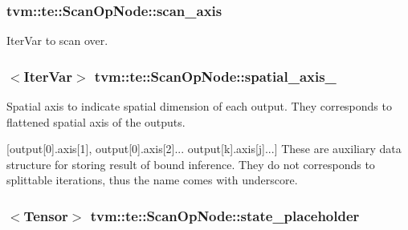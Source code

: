 \subsubsection[{\texorpdfstring{scan\+\_\+axis}{scan_axis}}]{ tvm\+::te\+::\+Scan\+Op\+Node\+::scan\+\_\+axis}\hypertarget{classtvm_1_1te_1_1ScanOpNode_a9c67e6383696efbba8e1ff9bd7470c8a}{}\label{classtvm_1_1te_1_1ScanOpNode_a9c67e6383696efbba8e1ff9bd7470c8a}


Iter\+Var to scan over. 

\subsubsection[{\texorpdfstring{spatial\+\_\+axis\+\_\+}{spatial_axis_}}]{$<${\bf Iter\+Var}$>$ tvm\+::te\+::\+Scan\+Op\+Node\+::spatial\+\_\+axis\+\_\+}\hypertarget{classtvm_1_1te_1_1ScanOpNode_ab52af0e689bd723c0a9c853c78a8bc78}{}\label{classtvm_1_1te_1_1ScanOpNode_ab52af0e689bd723c0a9c853c78a8bc78}


Spatial axis to indicate spatial dimension of each output. They corresponds to flattened spatial axis of the outputs. 

\mbox{[}output\mbox{[}0\mbox{]}.axis\mbox{[}1\mbox{]}, output\mbox{[}0\mbox{]}.axis\mbox{[}2\mbox{]}... output\mbox{[}k\mbox{]}.axis\mbox{[}j\mbox{]}...\mbox{]} These are auxiliary data structure for storing result of bound inference. They do not corresponds to splittable iterations, thus the name comes with underscore. 
\subsubsection[{\texorpdfstring{state\+\_\+placeholder}{state_placeholder}}]{$<${\bf Tensor}$>$ tvm\+::te\+::\+Scan\+Op\+Node\+::state\+\_\+placeholder}\hypertarget{classtvm_1_1te_1_1ScanOpNode_a69105f6a84dd4fb912a16bfaa68aebf6}{}\label{classtvm_1_1te_1_1ScanOpNode_a69105f6a84dd4fb912a16bfaa68aebf6}



